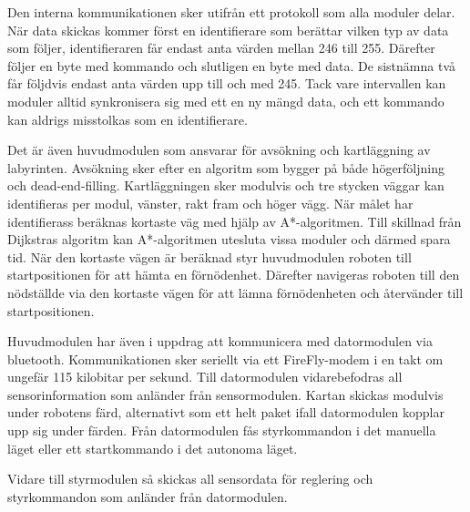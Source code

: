 \documentclass[10pt]{article}
\begin{document}
Den interna kommunikationen sker utifrån ett protokoll som alla moduler delar. När data skickas kommer först en identifierare som berättar vilken typ av data som följer, identifieraren får endast anta värden mellan 246 till 255. Därefter följer en byte med kommando och slutligen en byte med data. De sistnämna två får följdvis endast anta värden upp till och med 245. Tack vare intervallen kan moduler alltid synkronisera sig med ett en ny mängd data, och ett kommando kan aldrigs misstolkas som en identifierare. 

Det är även huvudmodulen som ansvarar för avsökning och kartläggning av labyrinten. Avsökning sker efter en algoritm som bygger på både högerföljning och dead-end-filling. Kartläggningen sker modulvis och tre stycken väggar kan identifieras per modul, vänster, rakt fram och höger vägg. När målet har identifierass beräknas kortaste väg med hjälp av A*-algoritmen. Till skillnad från Dijkstras algoritm kan A*-algoritmen utesluta vissa moduler och därmed spara tid. När den kortaste vägen är beräknad styr huvudmodulen roboten till startpositionen för att hämta en förnödenhet. Därefter navigeras roboten till den nödställde via den kortaste vägen för att lämna förnödenheten och återvänder till startpositionen.

Huvudmodulen har även i uppdrag att kommunicera med datormodulen via bluetooth. Kommunikationen sker seriellt via ett FireFly-modem i en takt om ungefär 115 kilobitar per sekund. Till datormodulen vidarebefodras all sensorinformation som anländer från sensormodulen. Kartan skickas modulvis under robotens färd, alternativt som ett helt paket ifall datormodulen kopplar upp sig under färden.  Från datormodulen fås styrkommandon i det manuella läget eller ett startkommando i det autonoma läget. 

Vidare till styrmodulen så skickas all sensordata för reglering och styrkommandon som anländer från datormodulen.
\end{document}
